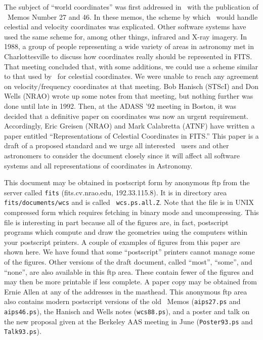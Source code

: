 The subject of ``world coordinates'' was first addressed in \AIPS\
with the publication of \AIPS\ Memos Number 27 and 46.  In these memos, the
scheme by which \AIPS\ would handle celestial and velocity coordinates
was explicated.  Other software systems have used the same scheme for,
among other things, infrared and X-ray imagery.  In 1988, a group of
people representing a wide variety of areas in astronomy met in
Charlottesville to discuss how coordinates really should be
represented in \hbox{{FITS}}.  That meeting concluded that, with some
additions, we could use a scheme similar to that used by \AIPS\ for
celestial coordinates.  We were unable to reach any agreement on
velocity/frequency coordinates at that meeting.  Bob Hanisch (STScI)
and Don Wells (NRAO) wrote up some notes from that meeting, but
nothing further was done until late in 1992.  Then, at the ADASS '92
meeting in Boston, it was decided that a definitive paper on
coordinates was now an urgent requirement.  Accordingly, Eric Greisen
(NRAO) and Mark Calabretta (ATNF) have written a paper entitled
``Representations of Celestial Coordinates in \hbox{{FITS}}.''  This
paper is a draft of a proposed standard and we urge all interested
\AIPS\ users and other astronomers to consider the document closely
since it will affect all software systems and all representations of
coordinates in Astronomy.

This document may be obtained in postscript form by anonymous ftp from
the server called {\tt fits} (fits.cv.nrao.edu, 192.33.115.8).  It is
in directory area {\tt fits/documents/wcs} and is called \hbox{{\tt
wcs.ps.all.Z}}.  Note that the file is in UNIX compressed form which
requires fetching in binary mode and uncompressing.  This file is
interesting in part because all of the figures are, in fact,
postscript programs which compute and draw the geometries using the
computers within your postscript printers.  A couple of examples of
figures from this paper are shown here.  We have found that some
``postscript'' printers cannot manage some of the figures.  Other
versions of the draft document, called ``most'', ``some'', and
``none'', are also available in this ftp area.  These contain fewer of
the figures and may then be more printable if less complete.  A paper
copy may be obtained from Ernie Allen at any of the addresses in the
masthead. This anonymous ftp area also contains modern postscript
versions of the old \AIPS\ Memos ({\tt aips27.ps} and {\tt
aips46.ps}), the Hanisch and Wells notes ({\tt wcs88.ps}), and a
poster and talk on the new proposal given at the Berkeley AAS meeting
in June ({\tt Poster93.ps} and {\tt Talk93.ps}).

